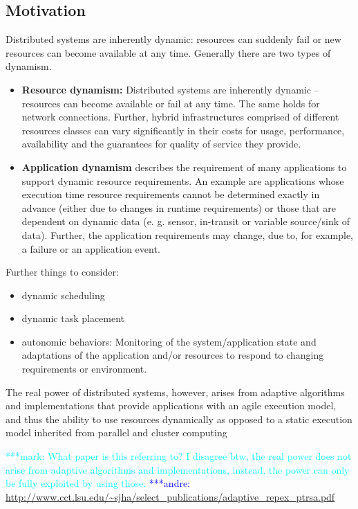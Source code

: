 \documentclass[]{article}
\newcommand{\alnote}[1]{ {\textcolor{blue} { ***andre: #1 }}}
\newcommand{\msnote}[1]{ {\textcolor{cyan} { ***mark: #1 }}}
\newcommand{\alnote}[1]{}
\begin{document}
\subsection{Motivation}

Distributed systems are inherently dynamic: resources can suddenly fail or 
new resources can become available at any time. Generally there are two types
of dynamism.
\begin{itemize}
    \item \textbf{Resource dynamism:} Distributed systems are inherently dynamic
     -- resources can become available or fail at any time. The same holds for
      network connections. Further, hybrid infrastructures comprised of 
      different resources classes can vary significantly in their costs for 
      usage, performance, availability and the guarantees for quality of service 
      they provide.
      
	\item \textbf{Application dynamism} describes the requirement of many
applications to support dynamic resource requirements. An example are
applications whose execution time resource requirements cannot be determined
exactly in advance (either due to changes in runtime requirements) or those that
are dependent on dynamic data (e. g. sensor, in-transit or variable source/sink
of data). Further, the application requirements may change, due to,
for example, a failure or an application event.
\end{itemize}

Further things to consider:
\begin{itemize}
    \item dynamic scheduling
    \item dynamic task placement
    \item autonomic behaviors: Monitoring of the system/application state and 
    adaptations of the application and/or resources to respond to changing 
    requirements or environment.
\end{itemize}

The real power of distributed systems, however, arises from adaptive algorithms
and implementations that provide applications with an agile execution model, and
thus the ability to use resources dynamically as opposed to a static execution
model inherited from parallel and cluster computing

\msnote{What paper is this referring to? I disagree btw, the real power does not arise from adaptive algorithms and implementations, instead, the power can only be fully exploited by using those.}\alnote{\url{http://www.cct.lsu.edu/~sjha/select_publications/adaptive_repex_ptrsa.pdf}}
\end{document}

